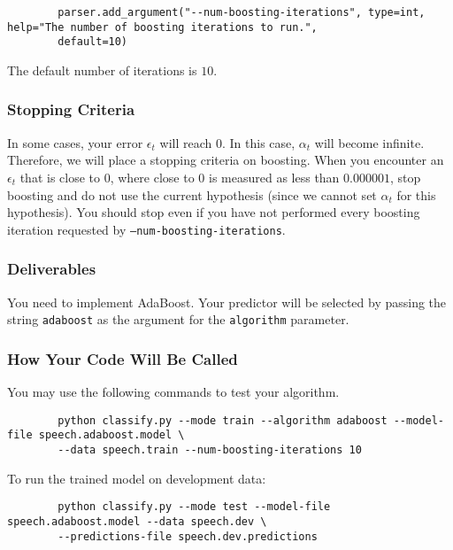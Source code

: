 \documentclass[11pt]{article}
\newcommand{\code}[1]{{\footnotesize \tt #1}}
\begin{document}
	\begin{footnotesize}
		\begin{verbatim}
		parser.add_argument("--num-boosting-iterations", type=int, help="The number of boosting iterations to run.",
		default=10)
		\end{verbatim}
	\end{footnotesize}
	The default number of iterations is $10$.
	
	\subsubsection{Stopping Criteria}
	In some cases, your error $\epsilon_t$ will reach 0. In this case, $\alpha_t$ will become infinite. Therefore, we will place a stopping criteria on boosting. When you encounter an $\epsilon_t$ that is close to $0$, where close to $0$ is measured as less than $0.000001$, stop boosting and do not use the current hypothesis (since we cannot set $\alpha_t$ for this hypothesis). You should stop even if you have not performed every boosting iteration requested by \code{--num-boosting-iterations}.
	
	\subsubsection{Deliverables}
	You need to implement AdaBoost. Your predictor will be selected by passing the string \code{adaboost} as the argument for the \code{algorithm} parameter.
	
	\subsubsection{How Your Code Will Be Called}
	You may use the following commands to test your algorithm.
	\begin{footnotesize}
		\begin{verbatim}
		python classify.py --mode train --algorithm adaboost --model-file speech.adaboost.model \
		--data speech.train --num-boosting-iterations 10
		\end{verbatim}
	\end{footnotesize}
	To run the trained model on development data:
	\begin{footnotesize}
		\begin{verbatim}
		python classify.py --mode test --model-file speech.adaboost.model --data speech.dev \
		--predictions-file speech.dev.predictions
		\end{verbatim}
	\end{footnotesize}
	
\end{document}
